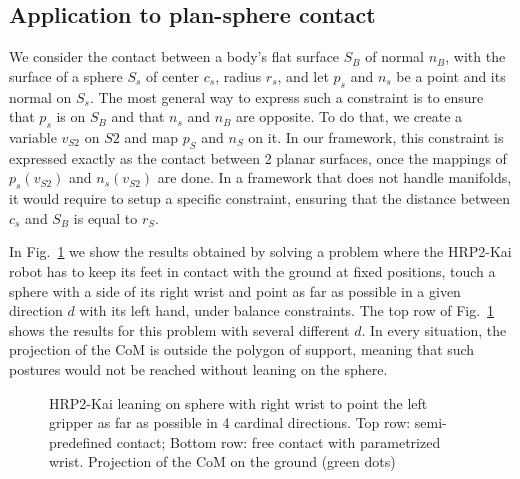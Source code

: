 
\subsection{Application to plan-sphere contact}
We consider the contact between a body's flat surface $S_B$ of normal $n_B$, with the surface of a sphere $S_s$ of center $c_s$, radius $r_s$, and let $p_s$ and $n_s$ be a point and its normal on $S_s$.
The most general way to express such a constraint is to ensure that $p_s$ is on $S_B$ and that $n_s$ and $n_B$ are opposite.
To do that, we create a variable $v_{S2}$ on $S2$ and map $p_S$ and $n_S$ on it.
In our framework, this constraint is expressed exactly as the contact between 2 planar surfaces, once the mappings of $p_s(v_{S2})$ and $n_s(v_{S2})$ are done.
In a framework that does not handle manifolds, it would require to setup a specific constraint, ensuring that the distance between $c_s$ and $S_B$ is equal to $r_S$.

In Fig.~\ref{fig:contact_plan_sphere} we show the results obtained by solving a problem where the HRP2-Kai robot has to keep its feet in contact with the ground at fixed positions, touch a sphere with a side of its right wrist and point as far as possible in a given direction $d$ with its left hand, under balance constraints.
The top row of Fig.~\ref{fig:contact_plan_sphere} shows the results for this problem with several different $d$.
In every situation, the projection of the CoM is outside the polygon of support, meaning that such postures would not be reached without leaning on the sphere.

\begin{figure}
\centering
  \centering
  \setlength\fboxsep{0pt}
  \setlength\fboxrule{1pt}
  \caption{HRP2-Kai leaning on sphere with right wrist to point the left gripper as far as possible in 4 cardinal directions.
  Top row: semi-predefined contact; Bottom row: free contact with parametrized wrist.
  Projection of the CoM on the ground (green dots)}
\label{fig:contact_plan_sphere}
\end{figure}

